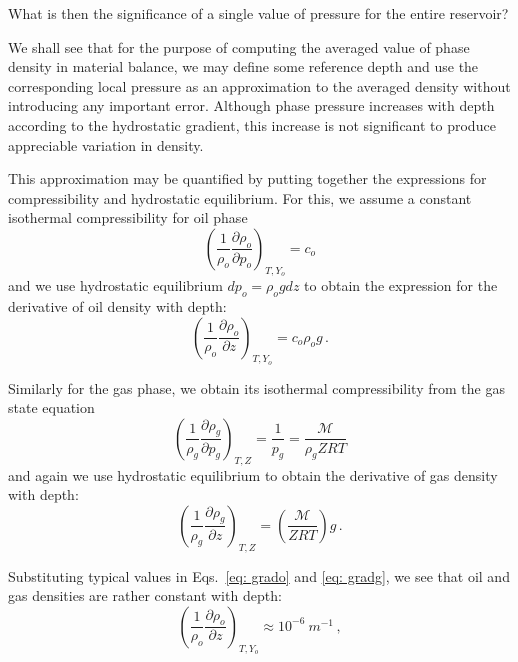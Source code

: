\documentclass[authoryear,preprint,review,12pt]{elsarticle}
\begin{document}
What is then the significance of a single value of pressure for the entire reservoir? 

We shall see that for the purpose of computing the averaged value of phase density in material balance, we may define some reference depth and use the corresponding local pressure as an approximation to the averaged density without introducing any important error. Although phase pressure increases with depth according to the hydrostatic gradient, this increase is not significant to produce appreciable variation in density.


This approximation may be quantified by putting together the expressions for compressibility and hydrostatic equilibrium. For this, we assume a constant isothermal compressibility for oil phase
\begin{equation}\label{eq: grado}
\left( \frac{1}{\rho_o}\frac{\partial \rho_o}{\partial p_o} \right)_{T,Y_o} = c_o 
\end{equation}
and we use hydrostatic equilibrium $dp_o = \rho_o g dz$ to obtain the expression for the derivative of oil density with depth:
\begin{equation}
\left( \frac{1}{\rho_o}\frac{\partial \rho_o}{\partial z} \right)_{T,Y_o} = c_o \rho_o g \, .
\end{equation}

Similarly for the gas phase, we obtain its isothermal compressibility from the gas state equation
\begin{equation}
\left(\frac{1}{\rho_g}\frac{\partial \rho_g}{\partial p_g}\right)_{T,Z} = \frac{1}{p_g} = \frac{\mathcal{M}}{\rho_g ZRT}
\end{equation}
and again we use hydrostatic equilibrium to obtain the derivative of gas density with depth:
\begin{equation}\label{eq: gradg}
\left(\frac{1}{\rho_g}\frac{\partial \rho_g}{\partial z}\right)_{T,Z} = \left(\frac{\mathcal{M}}{ Z R T}\right) g \, .
\end{equation}


Substituting typical values in Eqs.~\eqref{eq: grado} and \eqref{eq: gradg}, we see that oil and gas densities are rather constant with depth:
\begin{equation}
\left(\frac{1}{\rho_o}\frac{\partial \rho_o}{\partial z}\right)_{T,Y_o} \approx 10^{-6}\ m^{-1} \, ,
\end{equation}
\end{document}
